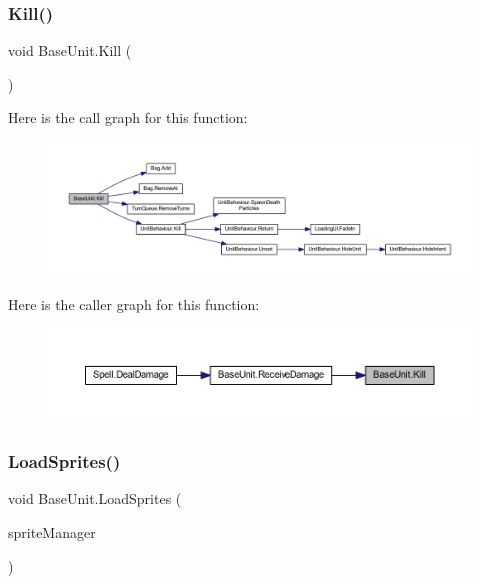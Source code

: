 \subsubsection{\texorpdfstring{Kill()}{Kill()}}
{\footnotesize\ttfamily void Base\+Unit.\+Kill (\begin{DoxyParamCaption}{ }\end{DoxyParamCaption})}

Here is the call graph for this function\+:
\nopagebreak
\begin{figure}[H]
\begin{center}
\leavevmode
\includegraphics[width=350pt]{class_base_unit_ae32912e26fcd7ea4b251045742064af4_cgraph}
\end{center}
\end{figure}
Here is the caller graph for this function\+:\nopagebreak
\begin{figure}[H]
\begin{center}
\leavevmode
\includegraphics[width=350pt]{class_base_unit_ae32912e26fcd7ea4b251045742064af4_icgraph}
\end{center}
\end{figure}
\mbox{\label{class_base_unit_ab93bf1d3c3ca2899d591a936760d46cf}} 
\subsubsection{\texorpdfstring{LoadSprites()}{LoadSprites()}}
{\footnotesize\ttfamily void Base\+Unit.\+Load\+Sprites (\begin{DoxyParamCaption}\item[{\mbox{\hyperlink{class_sprite_manager}{Sprite\+Manager}}}]{sprite\+Manager }\end{DoxyParamCaption})}

